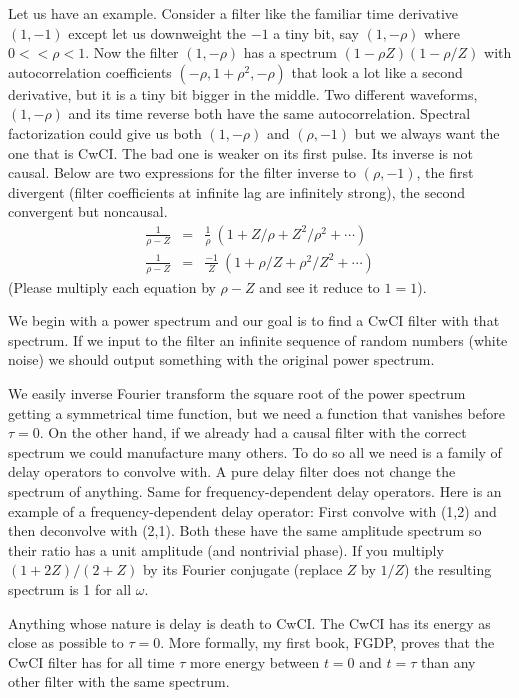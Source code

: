 \par
Let us have an example.
Consider a filter like the familiar time derivative $(1,-1)$ except
let us downweight the $-1$ a tiny bit, say $(1,-\rho)$ where $0<<\rho<1$.
Now the filter $(1,-\rho)$
has a spectrum $(1-\rho Z)(1-\rho/Z)$ with autocorrelation
coefficients $(-\rho, 1+\rho^2,-\rho)$ that look a lot like a second
derivative, but it is a tiny bit bigger in the middle.
Two different waveforms, $(1,-\rho)$ and its time reverse
both have the same autocorrelation.
Spectral factorization could give us both $(1,-\rho)$ and $(\rho,-1)$
but we always want the one that is CwCI.
The bad one is weaker on its first pulse.
Its inverse is not causal.
Below are two expressions for the filter inverse to $(\rho,-1)$,
the first divergent
(filter coefficients at infinite lag are infinitely strong),
the second convergent but noncausal.
\begin{eqnarray}
\frac{1}{ \rho -Z} &=& \frac{ 1}{\rho}\ ( 1 +Z/\rho +Z^2/\rho^2+ \cdots)
\\
\frac{1}{ \rho -Z} &=& \frac{-1}{ Z}\ ( 1 + \rho/Z + \rho^2/Z^2 + \cdots)
\end{eqnarray}
(Please multiply each equation by $\rho -Z$ and see it reduce to $1=1$).

\par
We begin with a power spectrum and our goal is to find a CwCI filter with that spectrum.
If we input to the filter an infinite sequence of random numbers
(white noise)
we should output something with the original power spectrum.

\par
We easily inverse Fourier transform the square root of the power spectrum
getting a symmetrical time function, but
we need a function that vanishes before $\tau=0$.
On the other hand,
if we already had a causal filter with the correct spectrum
we could manufacture many others.
To do so all we need is a family of delay operators to convolve with.
A pure delay filter does not change the spectrum of anything.
Same for frequency-dependent delay operators.
Here is an example of a frequency-dependent delay operator:
First convolve with (1,2) and then deconvolve with (2,1).
Both these have the same amplitude spectrum so their ratio
has a unit amplitude (and nontrivial phase).
If you multiply $(1+2Z)/(2+Z)$ by its Fourier conjugate
(replace $Z$ by $1/Z$) the resulting spectrum is 1 for all $\omega$.

\par
Anything whose nature is delay is death to CwCI.
The CwCI has its energy as close as possible to $\tau=0$.
More formally, my first book, FGDP, proves that the CwCI filter
has for all time $\tau$ more energy between $t=0$ and $t=\tau$
than any other filter with the same spectrum.

